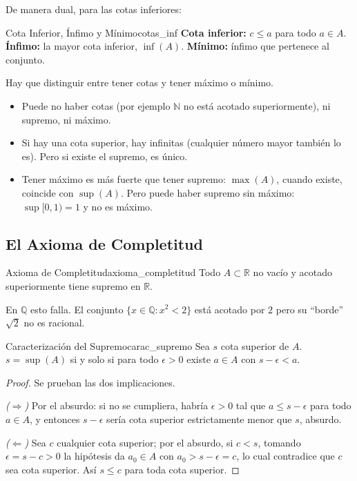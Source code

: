 \documentclass[11pt, a4paper]{article}
\begin{document}
De manera dual, para las cotas inferiores:

\begin{definicion}{Cota Inferior, Ínfimo y Mínimo}{cotas_inf}
\textbf{Cota inferior:} $c \le a$ para todo $a \in A$. \textbf{Ínfimo:} la mayor cota inferior,
$\inf(A)$. \textbf{Mínimo:} ínfimo que pertenece al conjunto.
\end{definicion}

\obs Hay que distinguir entre tener cotas y tener máximo o mínimo.
\begin{itemize}
    \item Puede no haber cotas (por ejemplo $\mathbb{N}$ no está acotado superiormente), ni supremo, ni
    máximo.
    \item Si hay una cota superior, hay infinitas (cualquier número mayor también lo es). Pero si
    existe el supremo, es único.
    \item Tener máximo es más fuerte que tener supremo: $\max(A)$, cuando existe, coincide con
    $\sup(A)$. Pero puede haber supremo sin máximo: $\sup [0,1) = 1$ y no es máximo.
\end{itemize}

\subsection{El Axioma de Completitud}

\begin{teorema}{Axioma de Completitud}{axioma_completitud}
Todo $A \subset \mathbb{R}$ no vacío y acotado superiormente tiene supremo en $\mathbb{R}$.
\end{teorema}

\obs En $\mathbb{Q}$ esto falla. El conjunto $\{x \in \mathbb{Q} : x^2 < 2\}$ está acotado por $2$
pero su ``borde'' $\sqrt{2}$ no es racional.

\begin{proposicion}{Caracterización del Supremo}{carac_supremo}
Sea $s$ cota superior de $A$. $s = \sup(A)$ si y solo si para todo $\epsilon > 0$ existe $a \in A$
con $s - \epsilon < a$.
\end{proposicion}

\begin{proof}
Se prueban las dos implicaciones.

\textit{($\Rightarrow$)} Por el absurdo: si no se cumpliera, habría $\epsilon > 0$ tal que
$a \le s - \epsilon$ para todo $a \in A$, y entonces $s - \epsilon$ sería cota superior
estrictamente menor que $s$, absurdo.

\textit{($\Leftarrow$)} Sea $c$ cualquier cota superior; por el absurdo, si $c < s$, tomando
$\epsilon = s - c > 0$ la
hipótesis da $a_0 \in A$ con $a_0 > s - \epsilon = c$, lo cual contradice que $c$ sea cota
superior. Así $s \le c$ para toda cota superior.
\end{proof}
\end{document}
